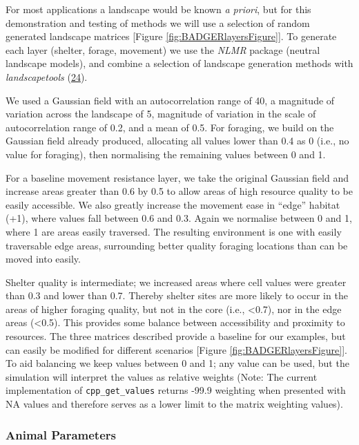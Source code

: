 \documentclass[10pt,a4paper]{article}
\begin{document}
For most applications a landscape would be known \emph{a priori}, but for this demonstration and testing of methods we will use a selection of random generated landscape matrices {[}Figure \ref{fig:BADGERlayersFigure}{]}.
To generate each layer (shelter, forage, movement) we use the \emph{NLMR} package (neutral landscape models), and combine a selection of landscape generation methods with \emph{landscapetools} (\protect\hyperlink{ref-Sciaini2018}{24}).

We used a Gaussian field with an autocorrelation range of 40, a magnitude of variation across the landscape of 5, magnitude of variation in the scale of autocorrelation range of 0.2, and a mean of 0.5.
For foraging, we build on the Gaussian field already produced, allocating all values lower than 0.4 as 0 (i.e., no value for foraging), then normalising the remaining values between 0 and 1.

For a baseline movement resistance layer, we take the original Gaussian field and increase areas greater than 0.6 by 0.5 to allow areas of high resource quality to be easily accessible.
We also greatly increase the movement ease in ``edge'' habitat (+1), where values fall between 0.6 and 0.3.
Again we normalise between 0 and 1, where 1 are areas easily traversed.
The resulting environment is one with easily traversable edge areas, surrounding better quality foraging locations than can be moved into easily.

Shelter quality is intermediate; we increased areas where cell values were greater than 0.3 and lower than 0.7.
Thereby shelter sites are more likely to occur in the areas of higher foraging quality, but not in the core (i.e., \textless0.7), nor in the edge areas (\textless0.5).
This provides some balance between accessibility and proximity to resources.
The three matrices described provide a baseline for our examples, but can easily be modified for different scenarios {[}Figure \ref{fig:BADGERlayersFigure}{]}.
To aid balancing we keep values between 0 and 1; any value can be used, but the simulation will interpret the values as relative weights (Note: The current implementation of \texttt{cpp\_get\_values} returns -99.9 weighting when presented with NA values and therefore serves as a lower limit to the matrix weighting values).

\hypertarget{animal-parameters}{%
\subsubsection{Animal Parameters}\label{animal-parameters}}
\end{document}
